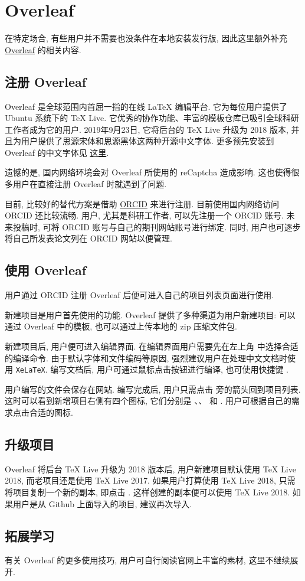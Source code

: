 
\chapter{Overleaf}

在特定场合,
有些用户并不需要也没条件在本地安装发行版,
因此这里额外补充 \href{www.overleaf.com}{Overleaf} 的相关内容.

\section{注册 Overleaf}

Overleaf 是全球范围内首屈一指的在线 \LaTeX{} 编辑平台.
它为每位用户提供了 Ubuntu 系统下的 \TeX{} Live.
它优秀的协作功能、丰富的模板仓库已吸引全球科研工作者成为它的用户.
2019年9月23日,
它将后台的 \TeX{} Live 升级为 2018 版本,
并且为用户提供了思源宋体和思源黑体这两种开源中文字体.
更多预先安装到 Overleaf 的中文字体见
\href{https://www.overleaf.com/learn/latex/Questions/What_OTF/TTF_fonts_are_supported_via_fontspec%3F#Fonts_for_CJK}{这里}.

遗憾的是,
国内网络环境会对 Overleaf 所使用的 reCaptcha 造成影响.
这也使得很多用户在直接注册 Overleaf 时就遇到了问题.

目前,
比较好的替代方案是借助 \href{https://orcid.org}{ORCID} 来进行注册.
目前使用国内网络访问 ORCID 还比较流畅.
用户, 尤其是科研工作者, 可以先注册一个 ORCID 账号.
未来投稿时,
可将 ORCID 账号与自己的期刊网站账号进行绑定.
同时,
用户也可逐步将自己所发表论文列在 ORCID 网站以便管理.

\section{使用 Overleaf}

用户通过 ORCID 注册 Overleaf 后便可进入自己的项目列表页面进行使用.

新建项目是用户首先使用的功能.
Overleaf 提供了多种渠道为用户新建项目:
可以通过 Overleaf 中的模板,
也可以通过上传本地的 \textsf{zip} 压缩文件包.

新建项目后,
用户便可进入编辑界面.
在编辑界面用户需要先在左上角  中选择合适的编译命令.
由于默认字体和文件编码等原因,
强烈建议用户在处理中文文档时使用 \texttt{XeLaTeX}.
编写文档后,
用户可通过鼠标点击按钮进行编译,
也可使用快捷键 .

用户编写的文件会保存在网站.
编写完成后,
用户只需点击  旁的箭头回到项目列表.
这时可以看到新增项目右侧有四个图标,
它们分别是 、、 和 .
用户可根据自己的需求点击合适的图标.

\section{升级项目}

Overleaf 将后台 \TeX{} Live 升级为 2018 版本后,
用户新建项目默认使用 \TeX{} Live 2018,
而老项目还是使用 \TeX{} Live 2017.
如果用户打算使用 \TeX{} Live 2018,
只需将项目复制一个新的副本,
即点击 .
这样创建的副本便可以使用 \TeX{} Live 2018.
如果用户是从 Github 上面导入的项目,
建议再次导入.

\section{拓展学习}

有关 Overleaf 的更多使用技巧,
用户可自行阅读官网上丰富的素材,
这里不继续展开.
